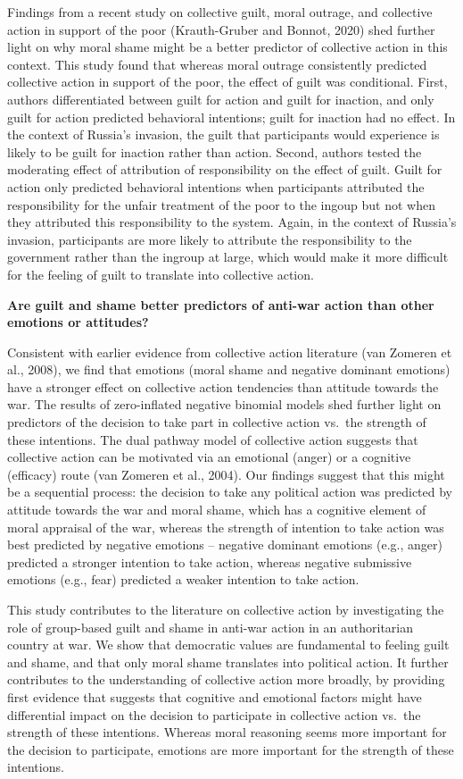 \documentclass[
]{article}
\begin{document}
Findings from a recent study on collective guilt, moral outrage, and collective action in support of the poor (Krauth-Gruber and Bonnot, 2020) shed further light on why moral shame might be a better predictor of collective action in this context. This study found that whereas moral outrage consistently predicted collective action in support of the poor, the effect of guilt was conditional. First, authors differentiated between guilt for action and guilt for inaction, and only guilt for action predicted behavioral intentions; guilt for inaction had no effect. In the context of Russia's invasion, the guilt that participants would experience is likely to be guilt for inaction rather than action. Second, authors tested the moderating effect of attribution of responsibility on the effect of guilt. Guilt for action only predicted behavioral intentions when participants attributed the responsibility for the unfair treatment of the poor to the ingoup but not when they attributed this responsibility to the system. Again, in the context of Russia's invasion, participants are more likely to attribute the responsibility to the government rather than the ingroup at large, which would make it more difficult for the feeling of guilt to translate into collective action.

\textbf{Are guilt and shame better predictors of anti-war action than other emotions or attitudes?}

Consistent with earlier evidence from collective action literature (van Zomeren et al., 2008), we find that emotions (moral shame and negative dominant emotions) have a stronger effect on collective action tendencies than attitude towards the war. The results of zero-inflated negative binomial models shed further light on predictors of the decision to take part in collective action vs.~the strength of these intentions. The dual pathway model of collective action suggests that collective action can be motivated via an emotional (anger) or a cognitive (efficacy) route (van Zomeren et al., 2004). Our findings suggest that this might be a sequential process: the decision to take any political action was predicted by attitude towards the war and moral shame, which has a cognitive element of moral appraisal of the war, whereas the strength of intention to take action was best predicted by negative emotions -- negative dominant emotions (e.g., anger) predicted a stronger intention to take action, whereas negative submissive emotions (e.g., fear) predicted a weaker intention to take action.

This study contributes to the literature on collective action by investigating the role of group-based guilt and shame in anti-war action in an authoritarian country at war. We show that democratic values are fundamental to feeling guilt and shame, and that only moral shame translates into political action. It further contributes to the understanding of collective action more broadly, by providing first evidence that suggests that cognitive and emotional factors might have differential impact on the decision to participate in collective action vs.~the strength of these intentions. Whereas moral reasoning seems more important for the decision to participate, emotions are more important for the strength of these intentions.
\end{document}
